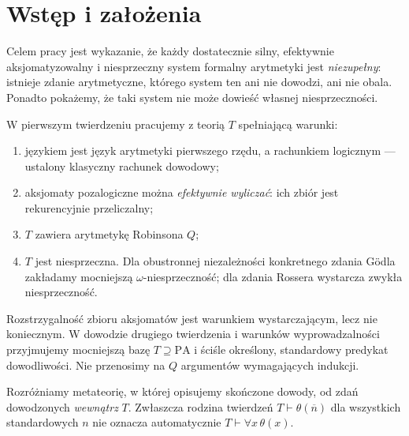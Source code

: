 \section{Wstęp i założenia}\label{sec:wstep}
Celem pracy jest wykazanie, że każdy dostatecznie silny, efektywnie aksjomatyzowalny i niesprzeczny system formalny arytmetyki jest \emph{niezupełny}: istnieje zdanie arytmetyczne, którego system ten ani nie dowodzi, ani nie obala. Ponadto pokażemy, że taki system nie może dowieść własnej niesprzeczności.

W pierwszym twierdzeniu pracujemy z teorią $T$ spełniającą warunki:
\begin{enumerate}[label=(\roman*)]
\item językiem jest język arytmetyki pierwszego rzędu, a rachunkiem logicznym --- ustalony klasyczny rachunek dowodowy;
\item aksjomaty pozalogiczne można \emph{efektywnie wyliczać}: ich zbiór jest rekurencyjnie przeliczalny;
\item $T$ zawiera arytmetykę Robinsona $Q$;
\item $T$ jest niesprzeczna. Dla obustronnej niezależności konkretnego zdania Gödla zakładamy mocniejszą $\omega$-niesprzeczność; dla zdania Rossera wystarcza zwykła niesprzeczność.
\end{enumerate}
Rozstrzygalność zbioru aksjomatów jest warunkiem wystarczającym, lecz nie koniecznym. W dowodzie drugiego twierdzenia i warunków wyprowadzalności przyjmujemy mocniejszą bazę $T\supseteq\mathrm{PA}$ i ściśle określony, standardowy predykat dowodliwości. Nie przenosimy na $Q$ argumentów wymagających indukcji.

Rozróżniamy metateorię, w której opisujemy skończone dowody, od zdań dowodzonych \emph{wewnątrz} $T$. Zwłaszcza rodzina twierdzeń $T\vdash\theta(\overline n)$ dla wszystkich standardowych $n$ nie oznacza automatycznie $T\vdash\forall x\,\theta(x)$.

